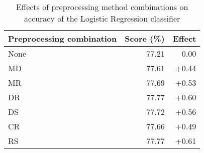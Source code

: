\begin{table}
	\centering
	\begin{tabular}{| l | r | r |}
		\hline
		\textbf{Preprocessing combination} & \textbf{Score} (\%) & \textbf{Effect} \\ \hline
		None & 77.21 & 0.00 \\ \hline
		MD & \cellcolor{green!25}77.61 & \cellcolor{green!25}+0.44 \\ \hline
		MR & \cellcolor{green!25}77.69 & \cellcolor{green!25}+0.53 \\ \hline
		DR & \cellcolor{green!25}77.77 & \cellcolor{green!25}+0.60 \\ \hline
		DS & \cellcolor{green!25}77.72 & \cellcolor{green!25}+0.56 \\ \hline
		CR & \cellcolor{green!25}77.66 & \cellcolor{green!25}+0.49 \\ \hline
		RS & \cellcolor{green!25}77.77 & \cellcolor{green!25}+0.61 \\ \hline		
	\end{tabular}
	\caption{Effects of preprocessing method combinations on accuracy of the Logistic Regression classifier}
	\label{tab:lr-prep-results-comb}
\end{table}